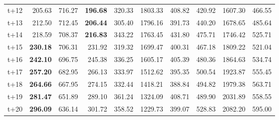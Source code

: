 \begin{table}[H]
\begin{tabular}{lrrrrrrrrr}
t+12  & 205.63  & 716.27  & \textbf{196.68}  & 320.33  & 1803.33  & 408.82  & 420.92  & 1607.30  & 466.55  \\
t+13  & 212.50  & 712.45  & \textbf{206.44}  & 305.40  & 1796.16  & 391.73  & 440.20  & 1678.65  & 485.64  \\
t+14  & 218.59  & 708.37  & \textbf{216.83}  & 343.22  & 1763.45  & 431.80  & 475.71  & 1746.42  & 525.71  \\
t+15  & \textbf{230.18}  & 706.31  & 231.92  & 319.32  & 1699.47  & 400.31  & 467.18  & 1809.22  & 521.04  \\
t+16  & \textbf{242.10}  & 696.75  & 245.38  & 336.25  & 1605.17  & 405.39  & 480.36  & 1864.63  & 534.74  \\
t+17  & \textbf{257.20}  & 682.95  & 266.13  & 333.97  & 1512.62  & 395.35  & 500.54  & 1923.87  & 555.45  \\
t+18  & \textbf{264.66}  & 667.95  & 274.15  & 332.44  & 1418.21  & 388.84  & 494.82  & 1979.38  & 563.71  \\
t+19  & \textbf{281.47}  & 651.89  & 289.10  & 361.24  & 1324.09  & 408.71  & 489.90  & 2031.89  & 558.55  \\
t+20  & \textbf{296.09}  & 636.14  & 301.72  & 358.52  & 1229.73  & 399.07  & 528.83  & 2082.20  & 595.00  \\

\bottomrule
\end{tabular}
\end{table}

